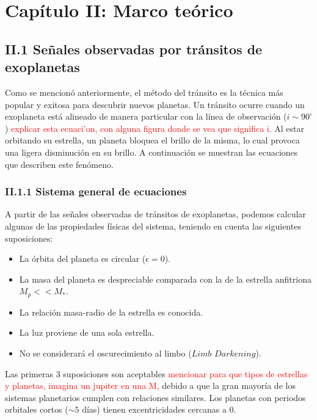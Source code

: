\chapter*{\textbf{Capítulo II: Marco teórico}}
\setcounter{chapter}{2}

\section*{II.1 Señales observadas por tránsitos de exoplanetas}

Como se mencionó anteriormente, el método del tránsito es la técnica más popular y exitosa para descubrir nuevos planetas. Un tránsito ocurre cuando un exoplaneta está alineado de manera particular con la línea de observación ($i\sim 90^{\circ}$) \textcolor{red}{explicar esta ecuaci'on, con alguna figura donde se vea que significa i}. Al estar orbitando su estrella, un planeta bloquea el brillo de la misma, lo cual provoca una ligera disminución en su brillo. A continuación se muestran las ecuaciones que describen este fenómeno.

\subsection*{II.1.1 Sistema general de ecuaciones}

A partir de las señales observadas de tránsitos de exoplanetas, podemos calcular algunas de las propiedades físicas del sistema, teniendo en cuenta las siguientes suposiciones:

\begin{itemize}
\item La órbita del planeta es circular ($\epsilon = 0$).
\item La masa del planeta es despreciable comparada con la de la estrella anfitriona \\ $M_{p} << M_{*}$.
\item La relación masa-radio de la estrella es conocida.
\item La luz proviene de una sola estrella.
\item No se considerará el oscurecimiento al limbo ($\textit{Limb Darkening}$).
\end{itemize}

Las primeras 3 suposiciones son aceptables \textcolor{red}{mencionar para que tipos de estrellas y planetas, imagina un jupiter en una M,} debido a que la gran mayoría de los sistemas planetarios cumplen con relaciones similares. Los planetas con periodos orbitales cortos ($\sim 5$ días) tienen excentricidades cercanas a 0.

